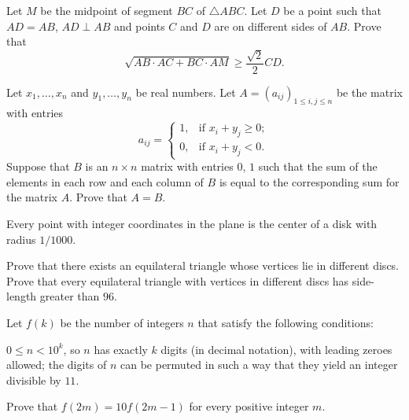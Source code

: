 \begin{probEG}[Kosovo MO 2021/10.4]
  Let $M$ be the midpoint of segment $BC$ of $\triangle ABC$. Let $D$ be a point
  such that $AD=AB$, $AD\perp AB$ and points $C$ and $D$ are on different sides
  of $AB$. Prove that
  \[\sqrt{AB\cdot AC+BC\cdot AM}\ge\frac{\sqrt{2}}{2}CD.\]
\end{probEG}

\note[Combinatoria]{}

\begin{probEG}[ISL 2003/C4]
  Let $x_1,\dots,x_n$ and $y_1,\dots,y_n$ be real numbers. Let
  $A=(a_{ij})_{1\le i,j\le n}$ be the matrix with entries
  \[
    a_{ij}=\begin{cases}
      1, & \text{if }x_i+y_j\ge 0; \\
      0, & \text{if }x_i+y_j<0.
    \end{cases}
  \]
  Suppose that $B$ is an $n\times n$ matrix with entries $0$, $1$ such that the
  sum of the elements in each row and each column of $B$ is equal to the
  corresponding sum for the matrix $A$. Prove that $A=B$.
\end{probEG}

\begin{probMR}[ISL 2003/C5]
  Every point with integer coordinates in the plane is the center of a disk with
  radius $1/1000$.
  \begin{enumerate}[(1)]
    \ii Prove that there exists an equilateral triangle whose vertices lie in
    different discs.
    \ii Prove that every equilateral triangle with vertices in different discs
    has side-length greater than $96$.
  \end{enumerate}
\end{probMR}

\begin{problem}[ISL 2003/C6]
  Let $f(k)$ be the number of integers $n$ that satisfy the following
  conditions:
  \begin{enumerate}[(i)]
    \ii $0\le n<10^k$, so $n$ has exactly $k$ digits (in decimal notation), with
    leading zeroes allowed;
    \ii the digits of $n$ can be permuted in such a way that they yield an
    integer divisible by $11$.
  \end{enumerate}
  Prove that $f(2m)=10f(2m-1)$ for every positive integer $m$.
\end{problem}
